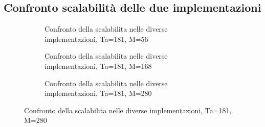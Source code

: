 \FloatBarrier
\subsection{Confronto scalabilit\`a delle due implementazioni}

\begin{figure}[h]
  \centering
  \begin{subfigure}[b]{.31\textheight}
    \centering
    \resizebox{\columnwidth}{!}{}
    \caption{Confronto della scalabilita nelle diverse implementazioni, Ta=181, M=56}
  \end{subfigure}
  \vfill
  \begin{subfigure}[b]{.31\textheight}
    \centering
    \resizebox{\columnwidth}{!}{}
    \caption{Confronto della scalabilita nelle diverse implementazioni, Ta=181, M=168}
  \end{subfigure}
  \vfill
  \begin{subfigure}[b]{.31\textheight}
    \centering
    \resizebox{\columnwidth}{!}{}
    \caption{Confronto della scalabilita nelle diverse implementazioni, Ta=181, M=280}
  \end{subfigure}
\end{figure}

\FloatBarrier

